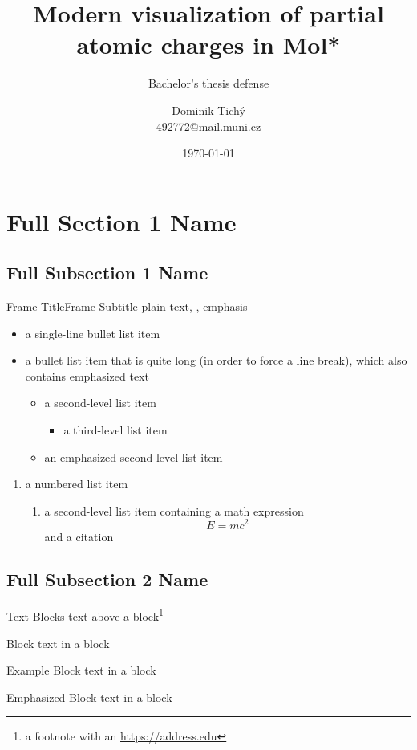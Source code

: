 \documentclass[
]{beamer}
\title[Modern visualization of partial atomic charges in Mol*]{Modern visualization of partial atomic charges in Mol*}
\subtitle[Short Presentation Subtitle]{Bachelor's thesis defense}
\author[Dominik Tichý]{Dominik Tichý\texorpdfstring{\\}{, }492772@mail.muni.cz}
\institute[FI MU]{Faculty of Informatics, Masaryk University}
\date{\today}
\begin{document}
\begin{frame}[plain]
\maketitle
\end{frame}

\section[Short Section 1 Name]{Full Section 1 Name}
\subsection[Short Subsection 1 Name]{Full Subsection 1 Name}

\begin{frame}{Frame Title}{Frame Subtitle}
plain text, , \alert{emphasis}
\begin{itemize}
  \item a single-line bullet list item
  \item a bullet list item that is quite long (in order to force a line break),
    which also contains \alert{emphasized text}
  \begin{itemize}
    \item a second-level list item
    \begin{itemize}
      \item a third-level list item
    \end{itemize}
    \item \alert{an emphasized second-level list item}
  \end{itemize}
\end{itemize}
\begin{enumerate}
  \item a numbered list item
  \begin{enumerate}
    \item a second-level list item containing a math expression
      \[ E = mc^2 \]
      and a citation
  \end{enumerate}
\end{enumerate}
\end{frame}

\subsection[Short Subsection 2 Name]{Full Subsection 2 Name}

\begin{frame}{Text Blocks}
text above a block\footnote{a footnote with an \url{https://address.edu}}
\begin{block}{Block}
  text in a block
\end{block}
\begin{exampleblock}{Example Block}
  text in a block
\end{exampleblock}
\begin{alertblock}{Emphasized Block}
  text in a block
\end{alertblock}
\end{frame}
\end{document}
